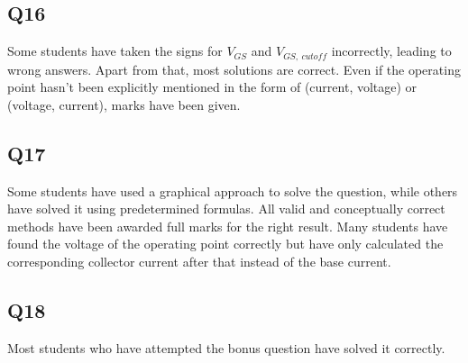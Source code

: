 \documentclass[12pt]{article}\date{}
\begin{document}
\subsection{Q16}
Some students have taken the signs for $V_{GS}$ and $V_{GS, \ cutoff}$ incorrectly, leading to wrong answers. Apart from that, most solutions are correct. Even if the operating point hasn't been explicitly mentioned in the form of (current, voltage) or (voltage, current), marks have been given.
\subsection{Q17}
Some students have used a graphical approach to solve the question, while others have solved it using predetermined formulas. All valid and conceptually correct methods have been awarded full marks for the right result. Many students have found the voltage of the operating point correctly but have only calculated the corresponding collector current after that instead of the base current. 

\subsection{Q18}
Most students who have attempted the bonus question have solved it correctly.
\end{document}
